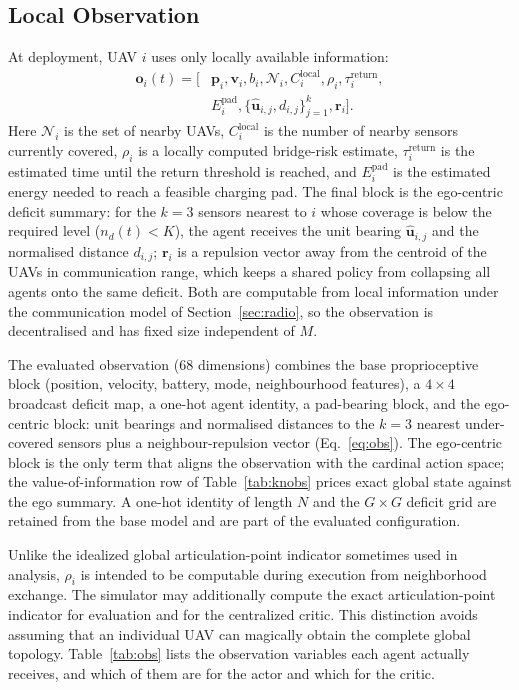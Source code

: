 \documentclass[conference]{IEEEtran}
\begin{document}
\subsection{Local Observation}
At deployment, UAV $i$ uses only locally available information:
\begin{equation}
\begin{split}
\mathbf o_i(t)=\bigl[&\mathbf p_i,\mathbf v_i,b_i,\mathcal N_i,C_i^{\mathrm{local}},\rho_i,\tau_i^{\mathrm{return}},\\
&E_i^{\mathrm{pad}},\{\hat{\mathbf u}_{i,j},d_{i,j}\}_{j=1}^{k},\mathbf r_i\bigr].
\end{split}
\label{eq:obs}
\end{equation}
Here $\mathcal N_i$ is the set of nearby UAVs, $C_i^{\mathrm{local}}$ is the number of nearby sensors currently covered, $\rho_i$ is a locally computed bridge-risk estimate, $\tau_i^{\mathrm{return}}$ is the estimated time until the return threshold is reached, and $E_i^{\mathrm{pad}}$ is the estimated energy needed to reach a feasible charging pad.  The final block is the ego-centric deficit summary: for the $k=3$ sensors nearest to $i$ whose coverage is below the required level ($n_d(t)<K$), the agent receives the unit bearing $\hat{\mathbf u}_{i,j}$ and the normalised distance $d_{i,j}$; $\mathbf r_i$ is a repulsion vector away from the centroid of the UAVs in communication range, which keeps a shared policy from collapsing all agents onto the same deficit.  Both are computable from local information under the communication model of Section~\ref{sec:radio}, so the observation is decentralised and has fixed size independent of $M$.

The evaluated observation (68 dimensions) combines the base proprioceptive block (position, velocity, battery, mode, neighbourhood features), a $4\times4$ broadcast deficit map, a one-hot agent identity, a pad-bearing block, and the ego-centric block: unit bearings and normalised distances to the $k=3$ nearest under-covered sensors plus a neighbour-repulsion vector (Eq.~\eqref{eq:obs}).  The ego-centric block is the only term that aligns the observation with the cardinal action space; the value-of-information row of Table~\ref{tab:knobs} prices exact global state against the ego summary.  A one-hot identity of length $N$ and the $G\times G$ deficit grid are retained from the base model and are part of the evaluated configuration.

Unlike the idealized global articulation-point indicator sometimes used in analysis, $\rho_i$ is intended to be computable during execution from neighborhood exchange. The simulator may additionally compute the exact articulation-point indicator for evaluation and for the centralized critic. This distinction avoids assuming that an individual UAV can magically obtain the complete global topology. Table~\ref{tab:obs} lists the observation variables each agent actually receives, and which of them are for the actor and which for the critic.
\end{document}

